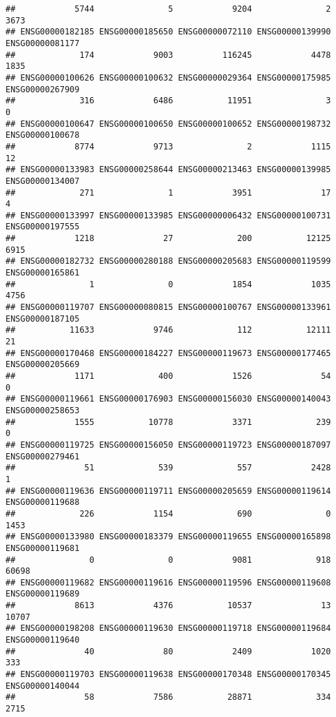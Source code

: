 \documentclass[
]{article}
\begin{document}
\begin{verbatim}
##            5744               5            9204               2            3673 
## ENSG00000182185 ENSG00000185650 ENSG00000072110 ENSG00000139990 ENSG00000081177 
##             174            9003          116245            4478            1835 
## ENSG00000100626 ENSG00000100632 ENSG00000029364 ENSG00000175985 ENSG00000267909 
##             316            6486           11951               3               0 
## ENSG00000100647 ENSG00000100650 ENSG00000100652 ENSG00000198732 ENSG00000100678 
##            8774            9713               2            1115              12 
## ENSG00000133983 ENSG00000258644 ENSG00000213463 ENSG00000139985 ENSG00000134007 
##             271               1            3951              17               4 
## ENSG00000133997 ENSG00000133985 ENSG00000006432 ENSG00000100731 ENSG00000197555 
##            1218              27             200           12125            6915 
## ENSG00000182732 ENSG00000280188 ENSG00000205683 ENSG00000119599 ENSG00000165861 
##               1               0            1854            1035            4756 
## ENSG00000119707 ENSG00000080815 ENSG00000100767 ENSG00000133961 ENSG00000187105 
##           11633            9746             112           12111              21 
## ENSG00000170468 ENSG00000184227 ENSG00000119673 ENSG00000177465 ENSG00000205669 
##            1171             400            1526              54               0 
## ENSG00000119661 ENSG00000176903 ENSG00000156030 ENSG00000140043 ENSG00000258653 
##            1555           10778            3371             239               0 
## ENSG00000119725 ENSG00000156050 ENSG00000119723 ENSG00000187097 ENSG00000279461 
##              51             539             557            2428               1 
## ENSG00000119636 ENSG00000119711 ENSG00000205659 ENSG00000119614 ENSG00000119688 
##             226            1154             690               0            1453 
## ENSG00000133980 ENSG00000183379 ENSG00000119655 ENSG00000165898 ENSG00000119681 
##               0               0            9081             918           60698 
## ENSG00000119682 ENSG00000119616 ENSG00000119596 ENSG00000119608 ENSG00000119689 
##            8613            4376           10537              13           10707 
## ENSG00000198208 ENSG00000119630 ENSG00000119718 ENSG00000119684 ENSG00000119640 
##              40              80            2409            1020             333 
## ENSG00000119703 ENSG00000119638 ENSG00000170348 ENSG00000170345 ENSG00000140044 
##              58            7586           28871             334            2715 

\end{verbatim}
\end{document}
